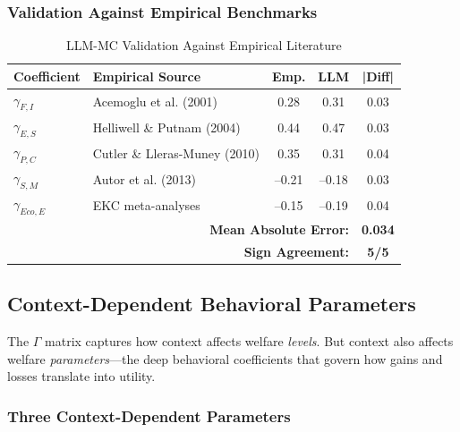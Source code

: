 \subsubsection{Validation Against Empirical Benchmarks}

\begin{table}[htbp]
\centering
\caption{LLM-MC Validation Against Empirical Literature}
\label{tab:gamma-validation}
\small
\begin{tabular}{@{}llccc@{}}
\toprule
\textbf{Coefficient} & \textbf{Empirical Source} & \textbf{Emp.} & \textbf{LLM} & \textbf{|Diff|} \\
\midrule
$\gamma_{F,I}$ & Acemoglu et al. (2001) & 0.28 & 0.31 & 0.03 \\
$\gamma_{E,S}$ & Helliwell \& Putnam (2004) & 0.44 & 0.47 & 0.03 \\
$\gamma_{P,C}$ & Cutler \& Lleras-Muney (2010) & 0.35 & 0.31 & 0.04 \\
$\gamma_{S,M}$ & Autor et al. (2013) & --0.21 & --0.18 & 0.03 \\
$\gamma_{Eco,E}$ & EKC meta-analyses & --0.15 & --0.19 & 0.04 \\
\midrule
\multicolumn{4}{r}{\textbf{Mean Absolute Error:}} & \textbf{0.034} \\
\multicolumn{4}{r}{\textbf{Sign Agreement:}} & \textbf{5/5} \\
\bottomrule
\end{tabular}
\end{table}

\subsection{Context-Dependent Behavioral Parameters}

The $\Gamma$ matrix captures how context affects welfare \emph{levels}.
But context also affects welfare \emph{parameters}---the deep behavioral coefficients
that govern how gains and losses translate into utility.

\subsubsection{Three Context-Dependent Parameters}

